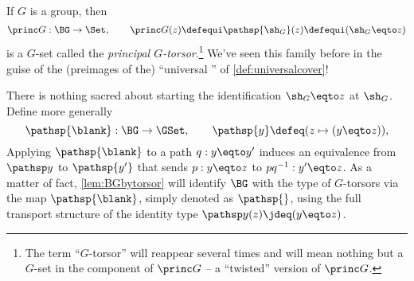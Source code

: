 \begin{example}\label{def:principaltorsor}
  If $G$ is a group, then
  \[
    \princ G:\BG\to\Set,
    \qquad\princ G(z)\defequi\pathsp{\sh_G}(z)\defequi(\sh_G \eqto z)
  \]
  is a $G$-set called the \emph{principal $G$-torsor}.\footnote{%
    The term ``$G$-torsor'' will reappear several times and will mean nothing but a $G$-set in the component of $\princ G$ -- a ``twisted'' version of $\princ G$.}
  We've seen this family before in the guise of the (preimages of the) ``universal \covering'' of \cref{def:universalcover}!

  There is nothing sacred about starting the identification
  $\sh_G \eqto z$ at $\sh_G$.
  Define more generally
  \begin{equation}\label{eq:pathsp}
    \pathsp{\blank}:\BG\to\GSet,
    \qquad
    \pathsp{y} \defeq (z \mapsto (y\eqto z)),
  \end{equation}
  Applying $\pathsp{\blank}$ to a path $q:y\eqto y'$
  induces an equivalence from $\pathsp y$ to $\pathsp {y'}$ that sends $p:y \eqto z$
  to $pq^{-1}:y'\eqto z$.
  As a matter of fact, \cref{lem:BGbytorsor} will identify $\BG$ with the type of
  $G$-torsors via the map $\pathsp{\blank}$, simply denoted as $\pathsp{}$,
  using the full transport structure of the identity type $\pathsp y(z)\jdeq(y \eqto z)$.
\end{example}


